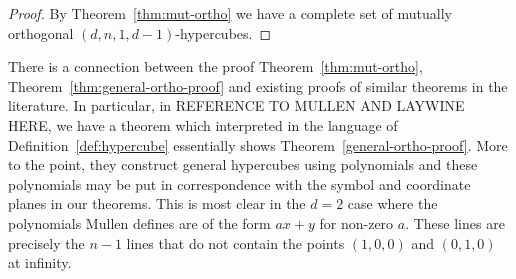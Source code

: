 \documentclass{article}
\begin{document}
\begin{proof}
  By Theorem~\ref{thm:mut-ortho} we have a complete set of mutually orthogonal \((d, n, 1, d - 1)\)-hypercubes.
\end{proof}

There is a connection between the proof Theorem~\ref{thm:mut-ortho}, Theorem~\ref{thm:general-ortho-proof} and existing proofs of similar theorems in the literature. In particular, in REFERENCE TO MULLEN AND LAYWINE HERE, we have a theorem which interpreted in the language of Definition~\ref{def:hypercube} essentially shows Theorem~\ref{general-ortho-proof}. More to the point, they construct general hypercubes using polynomials and these polynomials may be put in correspondence with the symbol and coordinate planes in our theorems. This is most clear in the \(d = 2\) case where the polynomials Mullen defines are of the form \(ax + y\) for non-zero \(a\). These lines are precisely the \(n - 1\) lines that do not contain the points \((1, 0, 0)\) and \((0, 1, 0)\) at infinity.
\end{document}
